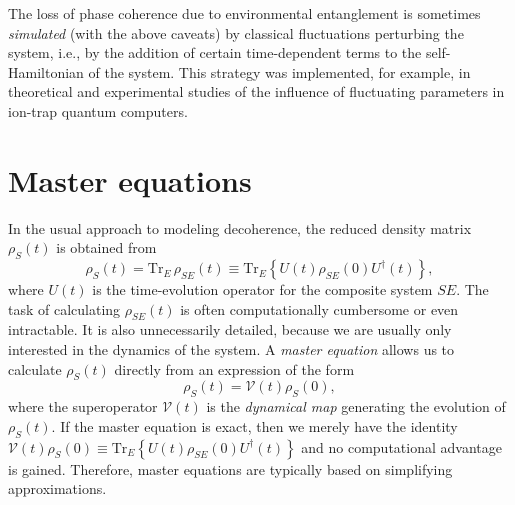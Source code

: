 \documentclass[aps,pra,reprint,amsmath,amssymb,showpacs,nofootinbib,floatfix,onecolumn,12pt]{revtex4-1}
\begin{document}
The loss of phase coherence due to environmental entanglement is sometimes \emph{simulated} (with the above caveats) by classical fluctuations perturbing the system, i.e., by the addition of certain time-dependent terms to the self-Hamiltonian of the system. This strategy was implemented, for example, in theoretical \cite{Schneider:1998:yz,Schneider:1999:tt} and experimental \cite{Turchette:2000:aa,Myatt:2000:yy} studies of the influence of fluctuating parameters in ion-trap quantum computers. 


\section{\label{sec:mastereqs}Master equations}

In the usual approach to modeling decoherence, the reduced density matrix $\rho_S(t)$ is obtained from
%
\begin{equation}
\label{eq:dmm2}
  \rho_S(t) = \text{Tr}_E \, \rho_{SE}(t) \equiv \text{Tr}_{E} \left\{ U(t) \rho_{SE}(0) U^\dagger(t) \right\},
\end{equation}
%
where $U(t)$ is the time-evolution operator for the composite system $SE$. The task of calculating $\rho_{SE}(t)$ is often computationally cumbersome or even intractable. It is also unnecessarily detailed, because we are usually only interested in the dynamics of the system. A \emph{master equation} allows us to calculate $\rho_S(t)$ directly from an expression of the form
%
\begin{equation}\label{eq:dmm}
\rho_S(t) = \mathcal{V}(t) \rho_S(0),
\end{equation}
%
where the superoperator $\mathcal{V}(t)$ is the \emph{dynamical map} generating the evolution of $\rho_S(t)$. If the master equation is exact, then we merely have the identity $\mathcal{V}(t) \rho_S(0) \equiv \text{Tr}_{E} \left\{ U(t) \rho_{SE}(0) U^\dagger(t) \right\}$ and no computational advantage is gained. Therefore, master equations are typically based on simplifying approximations. 
\end{document}
